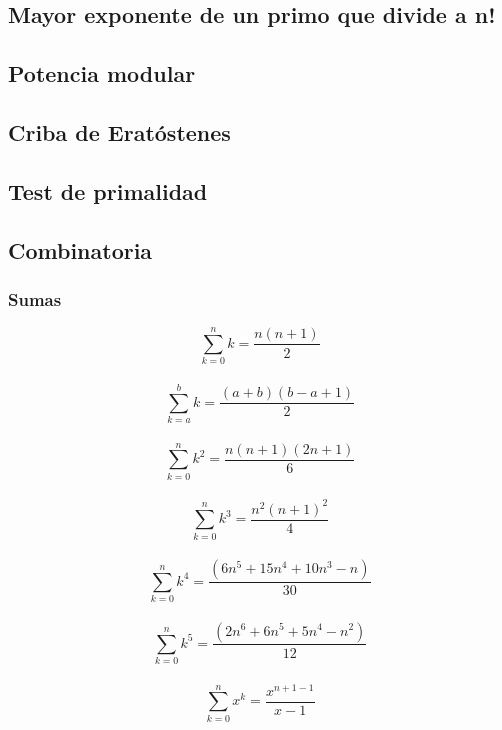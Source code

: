 \documentclass[10pt,letterpaper,twocolumn,twosided]{article}
\newcommand{\codigofuente}[1]{

\dotfill
}
\begin{document}
\codigofuente{src/mate/euclidean.cpp}

\subsection{Mayor exponente de un primo que divide a n!}

\codigofuente{src/mate/pow_div.cpp}

\subsection{Potencia modular}

\codigofuente{src/mate/mod_pow.cpp}

\subsection{Criba de Eratóstenes}

\codigofuente{src/mate/sieve.cpp}

\subsection{Test de primalidad}

\codigofuente{src/mate/rabin.cpp}


\subsection{Combinatoria}

\subsubsection{Sumas}


$$\sum_{k=0}^{n} k = \frac{n(n + 1)}{2}  $$\\ $$ \sum_{k=a}^{b} k = \frac{(a + b)(b - a + 1)}{2} $$ \\
$$ \sum_{k=0}^{n} k^2 = \frac{n(n + 1)(2n + 1)}{6} $$ \\ $$ \sum_{k=0}^{n} k^3 = \frac{n^{2}(n + 1)^{2}}{4} $$ \\
$$ \sum_{k=0}^{n} k^4 = \frac{(6n^5 + 15n^4 + 10n^3 - n)}{30} $$ \\ $$ \sum_{k=0}^{n} k^5 = \frac{(2n^6 + 6n^5 + 5n^4  - n^2)}{12} $$ \\
$$ \sum_{k=0}^{n} x^k = \frac{x^{n+1 - 1}}{x - 1} $$ \\
\end{document}
